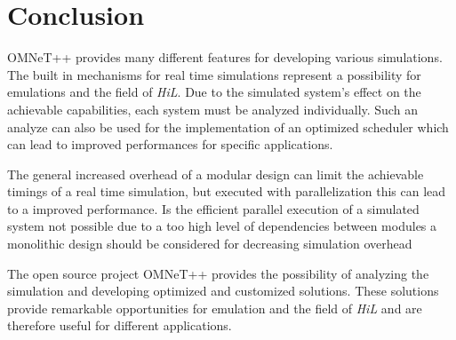 \chapter{Conclusion}
\label{cha:conclusion}


OMNeT++ provides many different features for developing various simulations.
The built in mechanisms for real time simulations represent a possibility for emulations and the field of \emph{HiL}.
Due to the simulated system's effect on the achievable capabilities, each system must be analyzed individually.
Such an analyze can also be used for the implementation of an optimized scheduler which can lead to improved performances for specific applications.


The general increased overhead of a modular design can limit the achievable timings of a real time simulation, but executed with parallelization this can lead to a improved performance.
Is the efficient parallel execution of a simulated system not possible due to a too high level of dependencies between modules a monolithic design should be considered for decreasing simulation overhead


The open source project OMNeT++ provides the possibility of analyzing the simulation and developing optimized and customized solutions.
These solutions provide remarkable opportunities for emulation and the field of \emph{HiL} and are therefore useful for different applications.